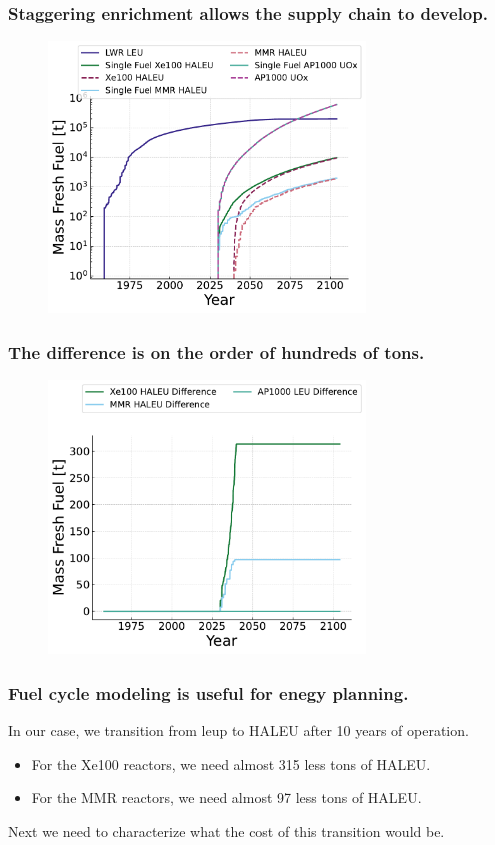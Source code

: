 \documentclass[9pt]{beamer}
\begin{document}
  \begin{frame}
    \frametitle{Staggering enrichment allows the supply chain to develop.}
    \begin{figure}
        \centering
        \includegraphics[width=0.75\textwidth]{images/fresh_fuel.pdf}
    \end{figure}
  \end{frame}

  \begin{frame}
    \frametitle{The difference is on the order of hundreds of tons.}
    \begin{figure}
        \centering
        \includegraphics[width=0.75\textwidth]{images/fresh_fuel_difference.pdf}
    \end{figure}
  \end{frame}

  \begin{frame}
      \frametitle{Fuel cycle modeling is useful for enegy planning.}
      In our case, we transition from \gls{leup} to HALEU after 10 years of operation.
      \begin{itemize}
          \item For the Xe100 reactors, we need almost 315 less tons of HALEU.
          \item For the MMR reactors, we need almost 97 less tons of HALEU.
      \end{itemize}
      Next we need to characterize what the cost of this transition would be.
  \end{frame}
\end{document}
